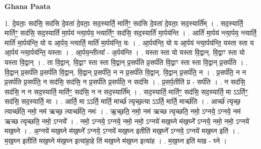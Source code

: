 \documentclass[17pt]{extarticle}
\begin{document}
\textbf{Ghana Paata } \newline

1. दे॒वताः॒ सद॑सि॒ सद॑सि दे॒वता॑ दे॒वताः॒ सद॒स्यार्ति॒ मार्तिꣳ॒॒ सद॑सि दे॒वता॑ दे॒वताः॒ सद॒स्यार्ति᳚म् । . सद॒स्यार्ति॒ मार्तिꣳ॒॒ सद॑सि॒ सद॒स्यार्ति॑ मा॒र्पय॑ न्त्या॒र्पय॒ न्त्यार्तिꣳ॒॒ सद॑सि॒ सद॒स्यार्ति॑ मा॒र्पय॑न्ति । . आर्ति॑ मा॒र्पय॑ न्त्या॒र्पय॒ न्त्यार्ति॒ मार्ति॑ मा॒र्पय॑न्ति॒ यो य आ॒र्पय॒ न्त्यार्ति॒ मार्ति॑ मा॒र्पय॑न्ति॒ यः । . आ॒र्पय॑न्ति॒ यो य आ॒र्पय॑ न्त्या॒र्पय॑न्ति॒ यस्ता स्ता य आ॒र्पय॑ न्त्या॒र्पय॑न्ति॒ यस्ताः । . आ॒र्पय॒न्तीत्या᳚ - अ॒र्पय॑न्ति । . यस्ता स्ता यो यस्ता वि॒द्वान्. वि॒द्वाꣳ स्ता यो यस्ता वि॒द्वान् । . ता वि॒द्वान्. वि॒द्वाꣳ स्ता स्ता वि॒द्वान् प्र॒सर्प॑ति प्र॒सर्प॑ति वि॒द्वाꣳ स्ता स्ता वि॒द्वान् प्र॒सर्प॑ति । . वि॒द्वान् प्र॒सर्प॑ति प्र॒सर्प॑ति वि॒द्वान्. वि॒द्वान् प्र॒सर्प॑ति॒ न न प्र॒सर्प॑ति वि॒द्वान्. वि॒द्वान् प्र॒सर्प॑ति॒ न । . प्र॒सर्प॑ति॒ न न प्र॒सर्प॑ति प्र॒सर्प॑ति॒ न सद॑सि॒ सद॑सि॒ न प्र॒सर्प॑ति प्र॒सर्प॑ति॒ न सद॑सि । . प्र॒सर्प॒तीति॑ प्र - सर्प॑ति । . न सद॑सि॒ सद॑सि॒ न न सद॒स्यार्ति॒ मार्तिꣳ॒॒ सद॑सि॒ न न सद॒स्यार्ति᳚म् । . सद॒स्यार्ति॒ मार्तिꣳ॒॒ सद॑सि॒ सद॒स्यार्ति॒ मा ऽऽर्तिꣳ॒॒ सद॑सि॒ सद॒स्यार्ति॒ मा । . आर्ति॒ मा ऽऽर्ति॒ मार्ति॒ मार्च्छ॑ त्यृच्छ॒त्या ऽऽर्ति॒ मार्ति॒ मार्च्छ॑ति । . आर्च्छ॑ त्यृच्छ॒ त्यार्च्छ॑ति॒ नमो॒ नम॑ ऋच्छ॒ त्यार्च्छ॑ति॒ नमः॑ । . ऋ॒च्छ॒ति॒ नमो॒ नम॑ ऋच्छ त्यृच्छति॒ नमो॒ ऽग्नये॒ ऽग्नये॒ नम॑ ऋच्छ त्यृच्छति॒ नमो॒ ऽग्नये᳚ । . नमो॒ ऽग्नये॒ ऽग्नये॒ नमो॒ नमो॒ ऽग्नये॑ मख॒घ्ने म॑ख॒घ्ने᳚ ऽग्नये॒ नमो॒ नमो॒ ऽग्नये॑ मख॒घ्ने । . अ॒ग्नये॑ मख॒घ्ने म॑ख॒घ्ने᳚ ऽग्नये॒ ऽग्नये॑ मख॒घ्न इतीति॑ मख॒घ्ने᳚ ऽग्नये॒ ऽग्नये॑ मख॒घ्न इति॑ । . म॒ख॒घ्न इतीति॑ मख॒घ्ने म॑ख॒घ्न इत्या॑हा॒हे ति॑ मख॒घ्ने म॑ख॒घ्न इत्या॑ह । . म॒ख॒घ्न इति॑ मख - घ्ने । \newline
\end{document}
